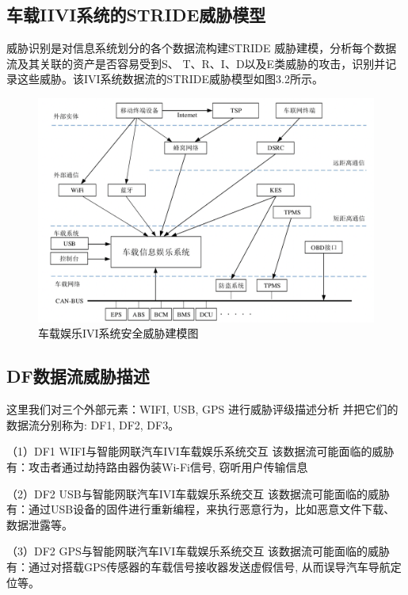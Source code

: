 \subsection{车载IIVI系统的STRIDE威胁模型}
威胁识别是对信息系统划分的各个数据流构建STRIDE
威胁建模，分析每个数据流及其关联的资产是否容易受到S、 T、R、I、D以及E类威胁的攻击，识别并记录这些威胁。该IVI系统数据流的STRIDE威胁模型如图3.2所示。
\begin{figure}
  \centering
  \includegraphics[scale=0.6]{resources/img/i33.png}
  \caption{车载娱乐IVI系统安全威胁建模图}
\end{figure}
\subsection{DF数据流威胁描述}
这里我们对三个外部元素：WIFI, USB, GPS 进行威胁评级描述分析
并把它们的数据流分别称为: DF1, DF2, DF3。

（1）DF1 WIFI与智能网联汽车IVI车载娱乐系统交互
该数据流可能面临的威胁有：攻击者通过劫持路由器伪装Wi-Fi信号, 窃听用户传输信息\cite{berghel2005wifi}

（2）DF2 USB与智能网联汽车IVI车载娱乐系统交互
该数据流可能面临的威胁有：通过USB设备的固件进行重新编程，来执行恶意行为，比如恶意文件下载、数据泄露等\cite{nissim2017usb}。

（3）DF2 GPS与智能网联汽车IVI车载娱乐系统交互
该数据流可能面临的威胁有：通过对搭载GPS传感器的车载信号接收器发送虚假信号, 从而误导汽车导航定位等\cite{alamleh2020cheat}。
